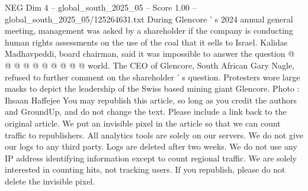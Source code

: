 \begin{textsample}{NEG Dim 4 – global\_south\_2025\_05 – Score 1.00 – global\_south\_2025\_05/125264631.txt}
During Glencore ' s 2024 annual general meeting, management was asked by a shareholder if the company is conducting human rights assessments on the use of the coal that it sells to Israel.
Kalidas Madhavpeddi, board chairman, said it was impossible to answer the question @ @ @ @ @ @ @ @ @ @ world.
The CEO of Glencore, South African Gary Nagle, refused to further comment on the shareholder ' s question.
Protesters wore large masks to depict the leadership of the Swiss based mining giant Glencore.
Photo : Ihsaan Haffejee You may republish this article, so long as you credit the authors and GroundUp, and do not change the text.
Please include a link back to the original article.
We put an invisible pixel in the article so that we can count traffic to republishers.
All analytics tools are solely on our servers.
We do not give our logs to any third party.
Logs are deleted after two weeks.
We do not use any IP address identifying information except to count regional traffic.
We are solely interested in counting hits, not tracking users.
If you republish, please do not delete the invisible pixel.

\end{textsample}
